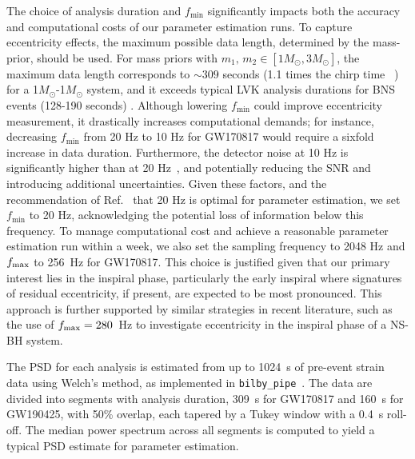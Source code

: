 \documentclass[aps,prd,twocolumn,superscriptaddress,groupedaddress,nofootinbib,showpacs,eqsecnum,useAms]{revtex4-2}
\begin{document}
The choice of analysis duration and $f_\text{min}$ significantly impacts both the accuracy and computational costs of our parameter estimation runs. To capture eccentricity effects, the maximum possible data length, determined by the mass-prior, should be used.
For mass priors with $m_1,\,m_2\in [1M_{\odot}, 3M_{\odot}]$, the maximum data length corresponds to $\sim309$ seconds (1.1 times the chirp time ~\cite{lalsuite}) for a 1$M_{\odot}$-1$M_{\odot}$ system, and it exceeds typical LVK analysis durations for BNS events (128-190 seconds) \cite{GW170817pe,LNB}. 
Although lowering $f_\text{min}$ could improve eccentricity measurement\cite{Favata2022, gupte2024}, it drastically increases computational demands; for instance, decreasing $f_\text{min}$ from 20 Hz to 10 Hz for GW170817 would require a sixfold increase in data duration.
Furthermore, the detector noise at 10 Hz is significantly higher than at 20 Hz~\cite{Sun2020, Sun2021}, and potentially reducing the SNR and introducing additional uncertainties. Given these factors, and the recommendation of Ref.~\cite{emma2024} that 20 Hz is optimal for parameter estimation, we set $f_\text{min}$ to 20 Hz, acknowledging the potential loss of information below this frequency. 
To manage computational cost and achieve a reasonable parameter estimation run within a week, we also set the sampling frequency to 2048 Hz and $f_{\rm max}$ to 256~Hz for GW170817. This choice is justified given that our primary interest lies in the inspiral phase, particularly the early inspiral where signatures of residual eccentricity, if present, are expected to be most pronounced. This approach is further supported by similar strategies in recent literature, such as the use of $f_{\rm max} = 280$~Hz to investigate eccentricity in the inspiral phase of a NS-BH system\cite{Morras2025b}.

The PSD for each analysis is estimated from up to 1024~s of pre-event strain data using Welch’s method, as implemented in \texttt{bilby\_pipe}~\cite{bilby_pipe_paper}. The data are divided into segments with analysis duration, 309~s for GW170817 and 160~s for GW190425, with 50\% overlap, each tapered by a Tukey window with a 0.4~s roll-off. The median power spectrum across all segments is computed to yield a typical PSD estimate for parameter estimation.
\end{document}

